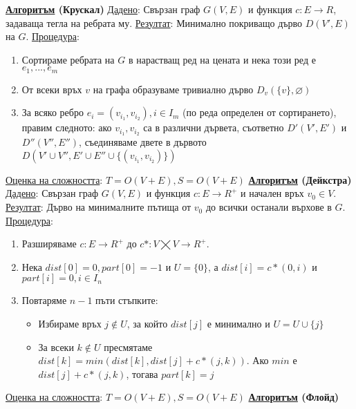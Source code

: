 \documentclass{article}
\begin{document}
\textbf{\underline{Алгоритъм} (Крускал)} \newline\newline
\underline{Дадено}: Свързан граф $G(V, E)$ и функция $c : E \rightarrow R$, задаваща тегла на ребрата му. \newline
\underline{Резултат}: Минимално покриващо дърво $D(V', E)$ на $G$. \newline
\underline{Процедура}:
\begin{enumerate}
    \item Сортираме ребрата на $G$ в нарастващ ред на цената и нека този ред е $e_1, ..., e_m$
    \item От всеки връх $v$ на графа образуваме тривиално дърво $D_v(\{v\}, \varnothing)$
    \item За всяко ребро $e_i = (v_{i_1}, v_{i_2}), i \in I_m$ (по реда определен от сортирането), правим следното:
    ако $v_{i_1}, v_{i_2}$ са в различни дървета, съответно $D'(V', E')$ и $D''(V'', E'')$, съединяваме двете в
    дървото $D(V' \cup V'', E' \cup E'' \cup \{(v_{i_1}, v_{i_2})\})$
\end{enumerate}
\underline{Оценка на сложността}: $T = O(V + E), S = O(V + E)$ \newline\newline
\textbf{\underline{Алгоритъм} (Дейкстра)} \newline\newline
\underline{Дадено}: Свързан граф $G(V, E)$ и функция $c : E \rightarrow R^+$ и начален връх $v_0 \in V$. \newline
\underline{Резултат}: Дърво на минималните пътища от $v_0$ до всички останали върхове в $G$. \newline
\underline{Процедура}:
\begin{enumerate}
    \item Разширяваме $c : E \rightarrow R^+$ до $c* : V \bigtimes V \rightarrow R^+$.
    \item Нека $dist[0] = 0, part[0] = -1$ и $U = \{0\}$, а $dist[i] = c*(0, i)$ и $part[i] = 0, i \in I_n$
    \item Повтаряме $n - 1$ пъти стъпките:
    \begin{itemize}
        \item Избираме връх $j \notin U$, за който $dist[j]$ е минимално и $U = U \cup \{j\}$
        \item За всеки $k \notin U$ пресмятаме $dist[k] = min(dist[k], dist[j] + c*(j, k))$.
        Ако $min$ е $dist[j] + c*(j, k)$, тогава $part[k] = j$
    \end{itemize}
\end{enumerate}
\underline{Оценка на сложността}: $T = O(V + E), S = O(V + E)$ \newline\newline
\textbf{\underline{Алгоритъм} (Флойд)} \newline\newline
\end{document}
